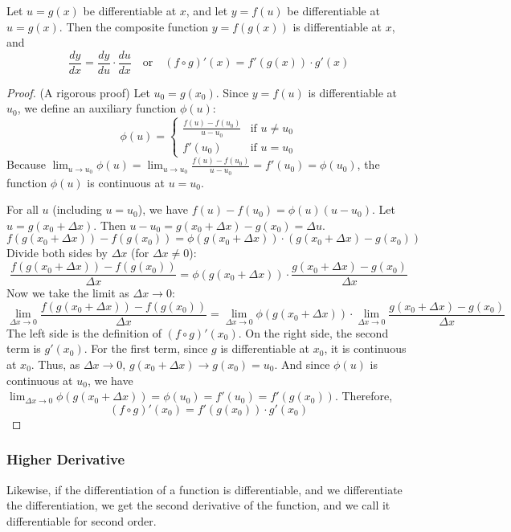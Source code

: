 \begin{theorem}
Let $u = g(x)$ be differentiable at $x$, and let $y = f(u)$ be differentiable at $u = g(x)$.
Then the composite function $y = f(g(x))$ is differentiable at $x$, and
\[
\frac{dy}{dx} = \frac{dy}{du} \cdot \frac{du}{dx} \quad \text{or} \quad (f \circ g)'(x) = f'(g(x)) \cdot g'(x)
\]
\end{theorem}

\begin{proof}
(A rigorous proof)
Let $u_0 = g(x_0)$. Since $y=f(u)$ is differentiable at $u_0$, we define an auxiliary function $\phi(u)$:
\[
\phi(u) = \begin{cases}
    \frac{f(u) - f(u_0)}{u - u_0} & \text{if } u \neq u_0 \\
    f'(u_0) & \text{if } u = u_0
\end{cases}
\]
Because $\lim_{u \to u_0} \phi(u) = \lim_{u \to u_0} \frac{f(u) - f(u_0)}{u - u_0} = f'(u_0) = \phi(u_0)$, the function $\phi(u)$ is continuous at $u=u_0$.

For all $u$ (including $u=u_0$), we have $f(u) - f(u_0) = \phi(u)(u - u_0)$.
Let $u = g(x_0 + \Delta x)$. Then $u - u_0 = g(x_0 + \Delta x) - g(x_0) = \Delta u$.
\[
f(g(x_0 + \Delta x)) - f(g(x_0)) = \phi(g(x_0 + \Delta x)) \cdot (g(x_0 + \Delta x) - g(x_0))
\]
Divide both sides by $\Delta x$ (for $\Delta x \neq 0$):
\[
\frac{f(g(x_0 + \Delta x)) - f(g(x_0))}{\Delta x} = \phi(g(x_0 + \Delta x)) \cdot \frac{g(x_0 + \Delta x) - g(x_0)}{\Delta x}
\]
Now we take the limit as $\Delta x \to 0$:
\[
\lim_{\Delta x \to 0} \frac{f(g(x_0 + \Delta x)) - f(g(x_0))}{\Delta x} = \lim_{\Delta x \to 0} \phi(g(x_0 + \Delta x)) \cdot \lim_{\Delta x \to 0} \frac{g(x_0 + \Delta x) - g(x_0)}{\Delta x}
\]
The left side is the definition of $(f \circ g)'(x_0)$.
On the right side, the second term is $g'(x_0)$.
For the first term, since $g$ is differentiable at $x_0$, it is continuous at $x_0$. Thus, as $\Delta x \to 0$, $g(x_0 + \Delta x) \to g(x_0) = u_0$.
And since $\phi(u)$ is continuous at $u_0$, we have $\lim_{\Delta x \to 0} \phi(g(x_0 + \Delta x)) = \phi(u_0) = f'(u_0) = f'(g(x_0))$.
Therefore,
\[
(f \circ g)'(x_0) = f'(g(x_0)) \cdot g'(x_0)
\]
\end{proof}


\subsubsection{Higher Derivative}

\begin{definition}
Likewise, if the differentiation of a function is differentiable, and we differentiate the differentiation, we get the second derivative of the function, and we call it differentiable for second order.
\end{definition}

